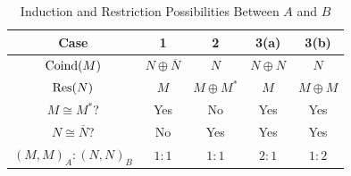 \begin{table}
\caption{Induction and Restriction Possibilities Between $A$ and $B$}
\label{tab:indres}
\begin{center}
\def\arraystretch{1.1}
\begin{tabular}{ c c c c c } 
    \toprule
Case & \textbf{1} & \textbf{2} & \textbf{3(a)} & \textbf{3(b)} \\
\midrule
 $\operatorname{Coind}(M)$ & $N \oplus \overline{N}$ & $N$ & $N \oplus N$ & $N$\\ 
 $\Res(N)$ & $M$ & $M \oplus M^*$ & $M$ &  $M \oplus M$ \\ 
 $M \cong M^*$? & Yes & No & Yes & Yes \\ 
 $N \cong \overline{N}$? & No & Yes & Yes & Yes \\ 
  $(M,M)_A : (N,N)_B$ & $1:1$ & $1:1$ & $2:1$ & $1:2$ \\ 
  \bottomrule
\end{tabular}
\end{center} 
\end{table}


